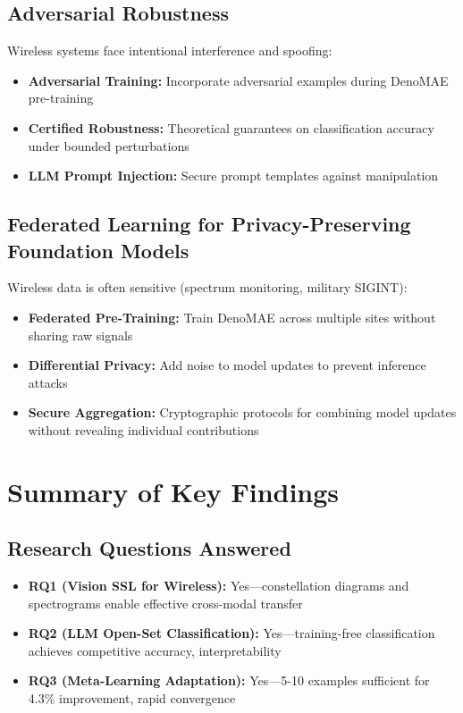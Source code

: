 \subsection{Adversarial Robustness}

Wireless systems face intentional interference and spoofing:
\begin{itemize}
    \item \textbf{Adversarial Training:} Incorporate adversarial examples during DenoMAE pre-training
    \item \textbf{Certified Robustness:} Theoretical guarantees on classification accuracy under bounded perturbations
    \item \textbf{LLM Prompt Injection:} Secure prompt templates against manipulation
\end{itemize}

\subsection{Federated Learning for Privacy-Preserving Foundation Models}

Wireless data is often sensitive (spectrum monitoring, military SIGINT):
\begin{itemize}
    \item \textbf{Federated Pre-Training:} Train DenoMAE across multiple sites without sharing raw signals
    \item \textbf{Differential Privacy:} Add noise to model updates to prevent inference attacks
    \item \textbf{Secure Aggregation:} Cryptographic protocols for combining model updates without revealing individual contributions
\end{itemize}

\section{Summary of Key Findings}

\subsection{Research Questions Answered}

\begin{itemize}
    \item \textbf{RQ1 (Vision SSL for Wireless):} Yes—constellation diagrams and spectrograms enable effective cross-modal transfer
    \item \textbf{RQ2 (LLM Open-Set Classification):} Yes—training-free classification achieves competitive accuracy, interpretability
    \item \textbf{RQ3 (Meta-Learning Adaptation):} Yes—5-10 examples sufficient for 4.3\% improvement, rapid convergence
\end{itemize}

